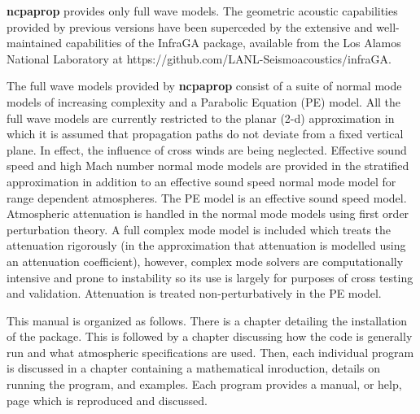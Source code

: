 \textbf{ncpaprop} provides only full wave models.  The geometric acoustic capabilities provided by previous versions have been superceded by the extensive and well-maintained capabilities of the InfraGA package, available from the Los Alamos National Laboratory at https://github.com/LANL-Seismoacoustics/infraGA.

The full wave models provided by \textbf{ncpaprop} consist of a suite of normal mode models of increasing complexity and a Parabolic Equation (PE) model. All the full wave models are currently restricted to the planar (2-d) approximation in which it is assumed that propagation paths do not deviate from a fixed vertical plane. In effect, the influence of cross winds are being neglected. Effective sound speed and high Mach number normal mode models are provided in the stratified approximation in addition to an effective sound speed normal mode model for range dependent atmospheres. The PE model is an effective sound speed model. Atmospheric attenuation is handled in the normal mode models using first order perturbation theory. A full complex mode model is included which treats the attenuation rigorously (in the approximation that attenuation is modelled using an attenuation coefficient), however, complex mode solvers are computationally intensive and prone to instability so its use is largely for purposes of cross testing and validation. Attenuation is treated non-perturbatively in the PE model. 

This manual is organized as follows. There is a chapter detailing the installation of the package. This is followed by a chapter discussing how the code is generally run and what atmospheric specifications are used. Then, each individual program is discussed in a chapter containing a mathematical inroduction, details on running the program, and examples. Each program provides a manual, or help, page which is reproduced and discussed. 